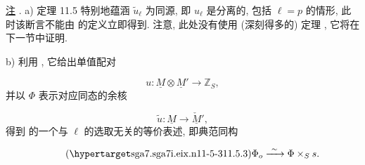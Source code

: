 \medskip
\noindent
\underline{注} . a) 定理 11.5 特别地蕴涵 $\widetilde u_\ell$ 为同源, 即 $u_\ell$ 是分离的, 包括 $\ell=p$ 的情形, 此时该断言不能由  的定义立即得到. 注意, 此处没有使用 (深刻得多的) 定理 , 它将在下一节中证明.

\smallskip
\noindent
b) 利用 , 它给出单值配对

\begin{equation*}
u:\underline M\otimes\underline M'\longrightarrow\mathbb Z_S,
\end{equation*}
并以 $\Phi$ 表示对应同态的余核

\begin{equation*}
\widetilde u:\underline M\longrightarrow\underline{\check M}',
\end{equation*}
得到  的一个与 $\ell$ 的选取无关的等价表述, 即典范同构

\begin{equation}\tag{\SGARefTarget{sga7.sga7i.eix.n11-5-3}{11.5.3}}
\Phi_o\xrightarrow{\ \sim\ }\Phi\times_S s.
\end{equation}


